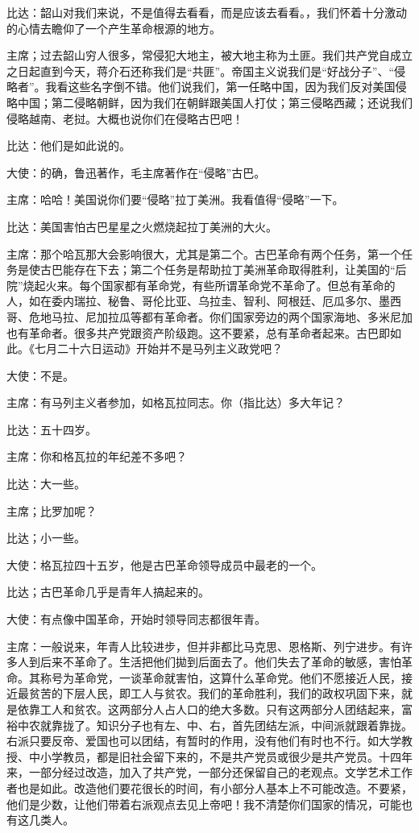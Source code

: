 比达：韶山对我们来说，不是值得去看看，而是应该去看看。，我们怀着十分激动的心情去瞻仰了一个产生革命根源的地方。

主席；过去韶山穷人很多，常侵犯大地主，被大地主称为土匪。我们共产党自成立之日起直到今天，蒋介石还称我们是“共匪”。帝国主义说我们是“好战分子”、“侵略者”。我看这些名字倒不错。他们说我们，第一任略中国，因为我们反对美国侵略中国；第二侵略朝鲜，因为我们在朝鲜跟美国人打仗；第三侵略西藏；还说我们侵略越南、老挝。大概也说你们在侵略古巴吧！

比达：他们是如此说的。

大使：的确，鲁迅著作，毛主席著作在“侵略”古巴。

主席：哈哈！美国说你们要“侵略”拉丁美洲。我看值得“侵略”一下。

比达：美国害怕古巴星星之火燃烧起拉丁美洲的大火。

主席：那个哈瓦那大会影响很大，尤其是第二个。古巴革命有两个任务，第一个任务是使古巴能存在下去；第二个任务是帮助拉丁美洲革命取得胜利，让美国的“后院”烧起火来。每个国家都有革命党，有些所谓革命党不革命了。但总有革命的人，如在委内瑞拉、秘鲁、哥伦比亚、乌拉圭、智利、阿根廷、厄瓜多尔、墨西哥、危地马拉、尼加拉瓜等都有革命者。你们国家旁边的两个国家海地、多米尼加也有革命者。很多共产党跟资产阶级跑。这不要紧，总有革命者起来。古巴即如此。《七月二十六日运动》开始并不是马列主义政党吧？

大使：不是。

主席：有马列主义者参加，如格瓦拉同志。你（指比达）多大年记？

比达：五十四岁。

主席：你和格瓦拉的年纪差不多吧？

比达：大一些。

主席；比罗加呢？

比达；小一些。

大使：格瓦拉四十五岁，他是古巴革命领导成员中最老的一个。

比达；古巴革命几乎是青年人搞起来的。

大使：有点像中国革命，开始时领导同志都很年青。

主席：一般说来，年青人比较进步，但并非都比马克思、恩格斯、列宁进步。有许多人到后来不革命了。生活把他们拋到后面去了。他们失去了革命的敏感，害怕革命。其称号为革命党，一谈革命就害怕，这算什么革命党。他们不愿接近人民，接近最贫苦的下层人民，即工人与贫农。我们的革命胜利，我们的政权巩固下来，就是依靠工人和贫农。这两部分人占人口的绝大多数。只有这两部分人团结起来，富裕中农就靠拢了。知识分子也有左、中、右，首先团结左派，中间派就跟着靠拢。右派只要反帝、爱国也可以团结，有暂时的作用，没有他们有时也不行。如大学教授、中小学教员，都是旧社会留下来的，不是共产党员或很少是共产党员。十四年来，一部分经过改造，加入了共产党，一部分还保留自己的老观点。文学艺术工作者也是如此。改造他们要花很长的时间，有小部分人基本上不可能改造。不要紧，他们是少数，让他们带着右派观点去见上帝吧！我不清楚你们国家的情况，可能也有这几类人。

